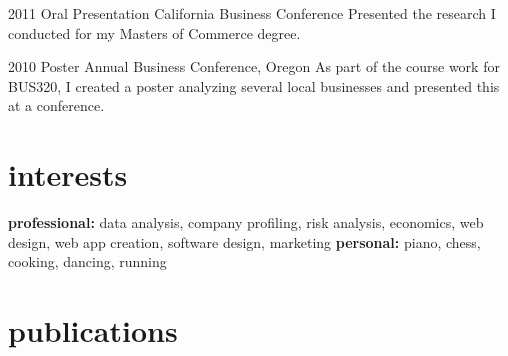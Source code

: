 \documentclass[]{friggeri-cv-a4}
\begin{document}
\begin{entrylist}


\entry
{2011}
{Oral Presentation}
{California Business Conference}
{Presented the research I conducted for my Masters of Commerce degree.}


\entry
{2010}
{Poster}
{Annual Business Conference, Oregon}
{As part of the course work for BUS320, I created a poster analyzing several local businesses and presented this at a conference.}


\end{entrylist}


\section{interests}

\textbf{professional:} data analysis, company profiling, risk analysis, economics, web design, web app creation, software design, marketing \textbf{personal:} piano, chess, cooking, dancing, running


\section{publications}



\begin{refsection} %
\nocite{*}
\printbibliography[type=inproceedings, title={international peer-reviewed conferences/proceedings}, notkeyword={france}, heading=bibheading]
\end{refsection}
\end{document}
